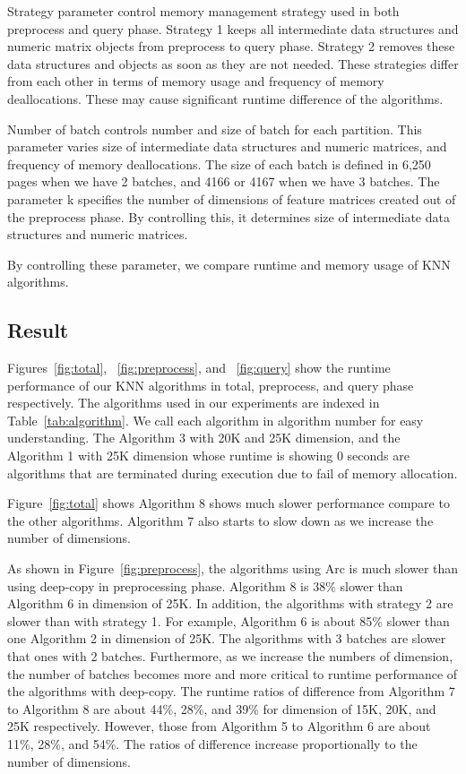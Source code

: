Strategy parameter control memory management strategy used in both preprocess and query phase.
Strategy 1 keeps all intermediate data structures and numeric matrix objects from preprocess to query phase. 
Strategy 2 removes these data structures and objects as soon as they are not needed. 
These strategies differ from each other in terms of memory usage and frequency of memory deallocations.
These may cause significant runtime difference of the algorithms.

Number of batch controls number and size of batch for each partition. This parameter varies size of intermediate data structures and numeric matrices, and 
frequency of memory deallocations. 
The size of each batch is defined in 6,250 pages when we have 2 batches, and 4166 or 4167 when we have 3 batches. 
The parameter k specifies the number of dimensions of feature matrices created out of the preprocess phase. 
By controlling this, it determines size of intermediate data structures and numeric matrices. 

By controlling these parameter, we compare runtime and memory usage of KNN algorithms. 


\subsection{Result}
\label{sec:history}
Figures~\ref{fig:total}, ~\ref{fig:preprocess}, and ~\ref{fig:query} show the runtime performance of our KNN algorithms in total, preprocess, and query phase respectively. 
The algorithms used in our experiments are indexed in Table~\ref{tab:algorithm}. We call each algorithm in algorithm number for easy understanding.
The Algorithm 3 with 20K and 25K dimension, and the Algorithm 1 with 25K dimension whose runtime is showing 0 seconds are algorithms that are terminated during execution due to fail of memory allocation.

Figure~\ref{fig:total} shows Algorithm 8 shows much slower performance compare to the other algorithms.
Algorithm 7 also starts to slow down as we increase the number of dimensions.  

As shown in Figure~\ref{fig:preprocess}, the algorithms using Arc is much slower than using deep-copy in preprocessing phase. 
Algorithm 8 is 38\%  slower than Algorithm 6 in dimension of 25K. 
In addition, the algorithms with strategy 2 are slower than with strategy 1. 
For example, Algorithm 6 is about 85\% slower than one Algorithm 2 in dimension of 25K.
The algorithms with 3 batches are slower that ones with 2 batches. Furthermore, as we increase the numbers of dimension, the number of batches becomes more and more critical to runtime performance of the algorithms with deep-copy.
The runtime ratios of difference from Algorithm 7 to Algorithm 8 are about 44\%, 28\%, and 39\% for dimension of 15K, 20K, and 25K respectively. 
However, those from Algorithm 5 to Algorithm 6 are about 11\%, 28\%, and 54\%. The ratios of difference increase proportionally to the number of dimensions. 

